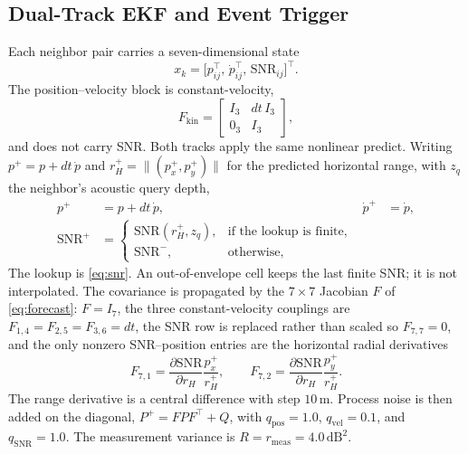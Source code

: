 \subsection{Dual-Track EKF and Event Trigger}
\label{sec:design:ekf}

Each neighbor pair carries a seven-dimensional state
\begin{equation}
\label{eq:state}
x_k=\bigl[p_{ij}^\top,\,\dot{p}_{ij}^\top,\,\mathrm{SNR}_{ij}\bigr]^\top.
\end{equation}
The position--velocity block is constant-velocity,
\begin{equation}
\label{eq:Fkin}
F_{\mathrm{kin}}
=\begin{bmatrix} I_3 & dt\,I_3 \\ 0_3 & I_3 \end{bmatrix},
\end{equation}
and does not carry SNR.
Both tracks apply the same nonlinear predict.
Writing $p^+=p+dt\,\dot{p}$ and
$r_H^+=\|(p_x^+,p_y^+)\|$ for the predicted horizontal range,
with $z_q$ the neighbor's acoustic query depth,
\begin{equation}
\label{eq:forecast}
\begin{aligned}
p^+&=p+dt\,\dot{p},&
\dot{p}^+&=\dot{p},\\
\mathrm{SNR}^+
&=
\begin{cases}
\mathrm{SNR}(r_H^+,z_q), & \text{if the lookup is finite},\\
\mathrm{SNR}^-, & \text{otherwise,}
\end{cases}
\end{aligned}
\end{equation}
The lookup is \eqref{eq:snr}.
An out-of-envelope cell keeps the last finite SNR; it is not
interpolated.
The covariance is propagated by the $7\times 7$ Jacobian $F$ of
\eqref{eq:forecast}: $F=I_7$, the three constant-velocity couplings
are $F_{1,4}=F_{2,5}=F_{3,6}=dt$, the SNR row is replaced rather
than scaled so $F_{7,7}=0$, and the only nonzero SNR--position
entries are the horizontal radial derivatives
\begin{equation*}
F_{7,1}
=\frac{\partial\mathrm{SNR}}{\partial r_H}\frac{p_x^+}{r_H^+},\qquad
F_{7,2}
=\frac{\partial\mathrm{SNR}}{\partial r_H}\frac{p_y^+}{r_H^+}.
\end{equation*}
The range derivative is a central difference with step
$10\,\mathrm{m}$.
Process noise is then added on the diagonal,
$P^+=FPF^\top+Q$, with
$q_{\mathrm{pos}}=1.0$, $q_{\mathrm{vel}}=0.1$, and
$q_{\mathrm{SNR}}=1.0$.
The measurement variance is
$R=r_{\mathrm{meas}}=4.0\,\mathrm{dB}^2$.

